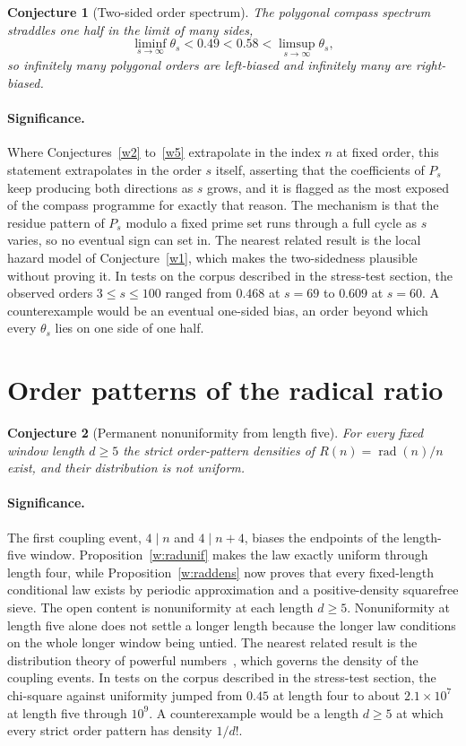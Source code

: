 \documentclass[11pt]{article}
\newtheorem{conjecture}{Conjecture}
\theoremstyle{definition}
\begin{document}
\begin{conjecture}[Two-sided order spectrum]\label{w6}
The polygonal compass spectrum straddles one half in the limit of many sides,
\[
\liminf_{s\to\infty}\theta_s<0.49<0.58<\limsup_{s\to\infty}\theta_s,
\]
so infinitely many polygonal orders are left-biased and infinitely many are right-biased.
\end{conjecture}

\paragraph{Significance.}
Where Conjectures~\ref{w2} to~\ref{w5} extrapolate in the index $n$ at fixed order, this statement extrapolates in the order $s$ itself, asserting that the coefficients of $P_s$ keep producing both directions as $s$ grows, and it is flagged as the most exposed of the compass programme for exactly that reason.  The mechanism is that the residue pattern of $P_s$ modulo a fixed prime set runs through a full cycle as $s$ varies, so no eventual sign can set in.  The nearest related result is the local hazard model of Conjecture~\ref{w1}, which makes the two-sidedness plausible without proving it.  In tests on the corpus described in the stress-test section, the observed orders $3\le s\le100$ ranged from $0.468$ at $s=69$ to $0.609$ at $s=60$.  A counterexample would be an eventual one-sided bias, an order beyond which every $\theta_s$ lies on one side of one half.

\section{Order patterns of the radical ratio}

\begin{conjecture}[Permanent nonuniformity from length five]\label{w7}
For every fixed window length $d\ge5$ the strict order-pattern densities of $R(n)=\operatorname{rad}(n)/n$ exist, and their distribution is not uniform.
\end{conjecture}

\paragraph{Significance.}
The first coupling event, $4\mid n$ and $4\mid n+4$, biases the endpoints of the length-five window.  Proposition~\ref{w:radunif} makes the law exactly uniform through length four, while Proposition~\ref{w:raddens} now proves that every fixed-length conditional law exists by periodic approximation and a positive-density squarefree sieve.  The open content is nonuniformity at each length $d\ge5$.  Nonuniformity at length five alone does not settle a longer length because the longer law conditions on the whole longer window being untied.  The nearest related result is the distribution theory of powerful numbers~\cite{Ten}, which governs the density of the coupling events.  In tests on the corpus described in the stress-test section, the chi-square against uniformity jumped from $0.45$ at length four to about $2.1\times10^7$ at length five through $10^9$.  A counterexample would be a length $d\ge5$ at which every strict order pattern has density $1/d!$.
\end{document}
